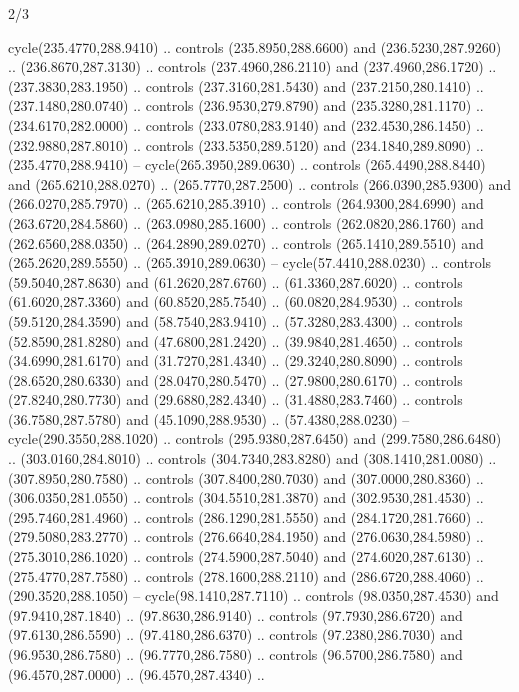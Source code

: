 \begin{flagdescription}{2/3}
\begin{scope}[xshift=0.5\flaglength,yshift=0.5\flagwidth,scale=\stretchfactor]
\begin{scope}[scale=0.001645\flagwidth,yshift=65mm,xshift=-63mm]
\begin{scope}[y=0.80pt, x=0.80pt, yscale=-1,]
\begin{scope}[cm={{1.33333,0.0,0.0,1.33333,(0.0,1e-05)}}]
  cycle(235.4770,288.9410) .. controls (235.8950,288.6600) and
  (236.5230,287.9260) .. (236.8670,287.3130) .. controls (237.4960,286.2110) and
  (237.4960,286.1720) .. (237.3830,283.1950) .. controls (237.3160,281.5430) and
  (237.2150,280.1410) .. (237.1480,280.0740) .. controls (236.9530,279.8790) and
  (235.3280,281.1170) .. (234.6170,282.0000) .. controls (233.0780,283.9140) and
  (232.4530,286.1450) .. (232.9880,287.8010) .. controls (233.5350,289.5120) and
  (234.1840,289.8090) .. (235.4770,288.9410) -- cycle(265.3950,289.0630) ..
  controls (265.4490,288.8440) and (265.6210,288.0270) .. (265.7770,287.2500) ..
  controls (266.0390,285.9300) and (266.0270,285.7970) .. (265.6210,285.3910) ..
  controls (264.9300,284.6990) and (263.6720,284.5860) .. (263.0980,285.1600) ..
  controls (262.0820,286.1760) and (262.6560,288.0350) .. (264.2890,289.0270) ..
  controls (265.1410,289.5510) and (265.2620,289.5550) .. (265.3910,289.0630) --
  cycle(57.4410,288.0230) .. controls (59.5040,287.8630) and (61.2620,287.6760)
  .. (61.3360,287.6020) .. controls (61.6020,287.3360) and (60.8520,285.7540) ..
  (60.0820,284.9530) .. controls (59.5120,284.3590) and (58.7540,283.9410) ..
  (57.3280,283.4300) .. controls (52.8590,281.8280) and (47.6800,281.2420) ..
  (39.9840,281.4650) .. controls (34.6990,281.6170) and (31.7270,281.4340) ..
  (29.3240,280.8090) .. controls (28.6520,280.6330) and (28.0470,280.5470) ..
  (27.9800,280.6170) .. controls (27.8240,280.7730) and (29.6880,282.4340) ..
  (31.4880,283.7460) .. controls (36.7580,287.5780) and (45.1090,288.9530) ..
  (57.4380,288.0230) -- cycle(290.3550,288.1020) .. controls (295.9380,287.6450)
  and (299.7580,286.6480) .. (303.0160,284.8010) .. controls (304.7340,283.8280)
  and (308.1410,281.0080) .. (307.8950,280.7580) .. controls (307.8400,280.7030)
  and (307.0000,280.8360) .. (306.0350,281.0550) .. controls (304.5510,281.3870)
  and (302.9530,281.4530) .. (295.7460,281.4960) .. controls (286.1290,281.5550)
  and (284.1720,281.7660) .. (279.5080,283.2770) .. controls (276.6640,284.1950)
  and (276.0630,284.5980) .. (275.3010,286.1020) .. controls (274.5900,287.5040)
  and (274.6020,287.6130) .. (275.4770,287.7580) .. controls (278.1600,288.2110)
  and (286.6720,288.4060) .. (290.3520,288.1050) -- cycle(98.1410,287.7110) ..
  controls (98.0350,287.4530) and (97.9410,287.1840) .. (97.8630,286.9140) ..
  controls (97.7930,286.6720) and (97.6130,286.5590) .. (97.4180,286.6370) ..
  controls (97.2380,286.7030) and (96.9530,286.7580) .. (96.7770,286.7580) ..
  controls (96.5700,286.7580) and (96.4570,287.0000) .. (96.4570,287.4340) ..

\end{scope}
\end{scope}
\end{scope}
\end{scope}
\end{flagdescription}

